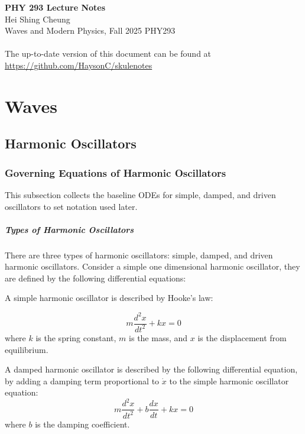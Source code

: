 \documentclass[11pt]{report}
\begin{document}
\thispagestyle{empty}
{\LARGE \bf PHY 293 Lecture Notes}\\
{\large Hei Shing Cheung}\\
Waves and Modern Physics, Fall 2025 \hfill PHY293\\
\\
The up-to-date version of this document can be found at \url{https://github.com/HaysonC/skulenotes}\\

\chapter{Waves}
\section{Harmonic Oscillators}

\subsection{Governing Equations of Harmonic Oscillators}
This subsection collects the baseline ODEs for simple, damped, and driven oscillators to set notation used later.

\paragraph{Types of Harmonic Oscillators} There are three types of harmonic oscillators: simple, damped, and driven harmonic oscillators. Consider a simple one dimensional harmonic oscillator, they are defined by the following differential equations:

\begin{definition}
    A simple harmonic oscillator is described by Hooke's law:

    \begin{equation} \label{eq:hooke}
        m \frac{d^2 x}{dt^2} + kx = 0
    \end{equation}
    where \( k \) is the spring constant, \( m \) is the mass, and \( x \) is the displacement from equilibrium.
\end{definition}

\begin{definition}
    A damped harmonic oscillator is described by the following differential equation, by adding a damping term proportional to $\dot{x}$ to the simple harmonic oscillator equation:
    \begin{equation} \label{eq:damped_ho}
        m \frac{d^2 x}{dt^2} + b \frac{dx}{dt} + kx = 0   
    \end{equation}
    where \( b \) is the damping coefficient.
\end{definition}
\end{document}
